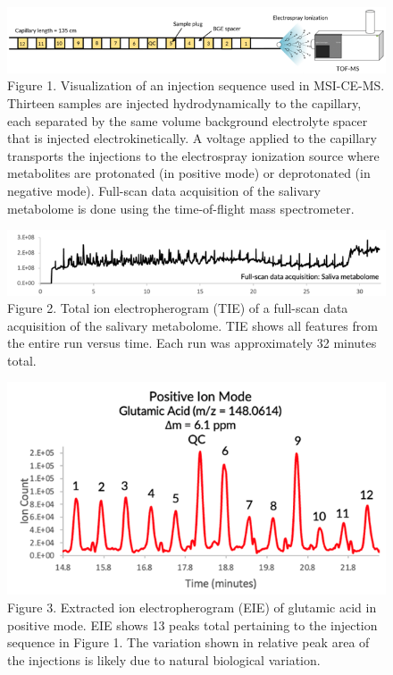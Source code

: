 \documentclass[journal=jacsat,manuscript=article]{achemso}
\begin{document}
\begin{figure}
\includegraphics[width=1\linewidth]{../Figures/Figure1} \caption{Figure 1. Visualization of an injection sequence used in MSI-CE-MS. Thirteen samples are injected hydrodynamically to the capillary, each separated by the same volume background electrolyte spacer that is injected electrokinetically. A voltage applied to the capillary transports the injections to the electrospray ionization source where metabolites are protonated (in positive mode) or deprotonated (in negative mode). Full-scan data acquisition of the salivary metabolome is done using the time-of-flight mass spectrometer.}\label{fig:unnamed-chunk-1}
\end{figure}

\begin{figure}
\includegraphics[width=1\linewidth]{../Figures/Figure2} \caption{Figure 2. Total ion electropherogram (TIE) of a full-scan data acquisition of the salivary metabolome. TIE shows all features from the entire run versus time. Each run was approximately 32 minutes total.}\label{fig:unnamed-chunk-2}
\end{figure}

\begin{figure}
\includegraphics[width=1\linewidth]{../Figures/Figure3} \caption{Figure 3. Extracted ion electropherogram (EIE) of glutamic acid in positive mode. EIE shows 13 peaks total pertaining to the injection sequence in Figure 1. The variation shown in relative peak area of the injections is likely due to natural biological variation.}\label{fig:unnamed-chunk-3}
\end{figure}
\end{document}
